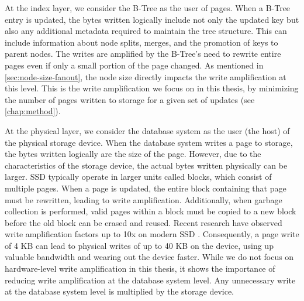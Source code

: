 At the index layer, we consider the B-Tree as the user of pages.
When a B-Tree entry is updated, the bytes written logically include not only the updated key but also any additional metadata required to maintain the tree structure.
This can include information about node splits, merges, and the promotion of keys to parent nodes.
The writes are amplified by the B-Tree's need to rewrite entire pages even if only a small portion of the page changed.
As mentioned in \autoref{sec:node-size-fanout}, the node size directly impacts the write amplification at this level.
This is the write amplification we focus on in this thesis, by minimizing the number of pages written to storage for a given set of updates (see \autoref{chap:method}).

At the physical layer, we consider the database system as the user (the host) of the physical storage device.
When the database system writes a page to storage, the bytes written logically are the size of the page.
However, due to the characteristics of the storage device, the actual bytes written physically can be larger.
\ac{SSD} typically operate in larger units called blocks, which consist of multiple pages.
When a page is updated, the entire block containing that page must be rewritten, leading to write amplification.
Additionally, when garbage collection is performed, valid pages within a block must be copied to a new block before the old block can be erased and reused.
Recent research have observed write amplification factors up to 10x on modern \ac{SSD} \cite{haas2025ssd}.
Consequently, a page write of 4 KB can lead to physical writes of up to 40 KB on the device, using up valuable bandwidth and wearing out the device faster.
While we do not focus on hardware-level write amplification in this thesis, it shows the importance of reducing write amplification at the database system level.
Any unnecessary write at the database system level is multiplied by the storage device.

